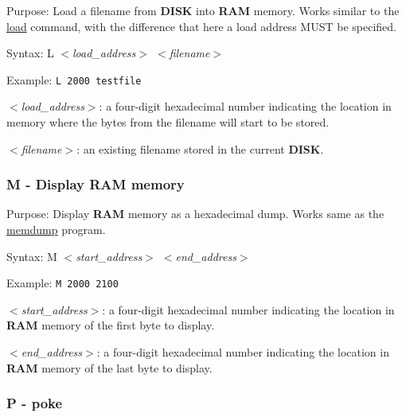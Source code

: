        Purpose: Load a filename from \textbf{DISK} into \textbf{RAM} memory.
        Works similar to the \hyperref[cmd:load]{load} command, with the
        difference that here a load address MUST be specified.

        Syntax: L \textit{$<$load\_address$>$ $<$filename$>$}

        Example: \texttt{L 2000 testfile}

        \hspace{1cm}\textit{$<$load\_address$>$}: a four-digit hexadecimal
        number indicating the location in memory where the bytes from the
        filename will start to be stored.

        \hspace{1cm}\textit{$<$filename$>$}: an existing filename stored in the
        current \textbf{DISK}.

        \subsubsection{M - Display RAM memory}

        Purpose: Display \textbf{RAM} memory as a hexadecimal dump. Works same
        as the \hyperref[software:memdump]{memdump} program.

        Syntax: M \textit{$<$start\_address$>$ $<$end\_address$>$}

        Example: \texttt{M 2000 2100}

        \hspace{1cm}\textit{$<$start\_address$>$}: a four-digit hexadecimal
        number indicating the location in \textbf{RAM} memory of the first byte
        to display.

        \hspace{1cm}\textit{$<$end\_address$>$}: a four-digit hexadecimal
        number indicating the location in \textbf{RAM} memory of the last byte
        to display.

        \subsubsection{P - poke}

